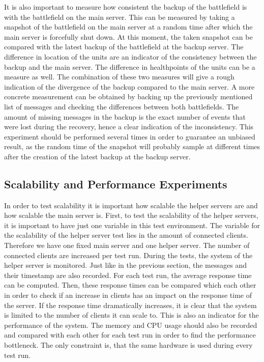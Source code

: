 It is also important to measure how consistent the backup of the battlefield is with the battlefield on the main server.
This can be measured by taking a snapshot of the battlefield on the main server at a random time after which the main server is forcefully shut down. 
At this moment, the taken snapshot can be compared with the latest backup of the battlefield at the backup server. 
The difference in location of the units are an indicator of the consistency between the backup and the main server. The difference in healthpoints of the units can be a measure as well. The combination of these two measures will give a rough indication of the divergence of the backup compared to the main server. 
A more concrete measurement can be obtained by backing up the previously mentioned list of messages and checking the differences between both battlefields. The amount of missing messages in the backup is the exact number of events that were lost during the recovery, hence a clear indication of the inconsistency. 
This experiment should be performed several times in order to guarantee an unbiased result, as the random time of the snapshot will probably sample at different times after the creation of the latest backup at the backup server. 

\subsection{Scalability and Performance Experiments}
In order to test scalability it is important how scalable the helper servers are and how scalable the main server is. 
First, to test the scalability of the helper servers, it is important to have just one variable in this test environment. 
The variable for the scalability of the helper server test lies in the amount of connected clients. 
Therefore we have one fixed main server and one helper server.
The number of connected clients are increased per test run. 
During the tests, the system of the helper server is monitored.
Just like in the previous section, the messages and their timestamp are also recorded.
For each test run, the average response time can be computed.
Then, these response times can be compared which each other in order to check if an increase in clients has an impact on the response time of the server.
If the response time dramatically increases, it is clear that the system is limited to the number of clients it can scale to. 
This is also an indicator for the performance of the system.
The memory and CPU usage should also be recorded  and compared with each other for each test run in order to find the performance bottleneck. 
The only constraint is, that the same hardware is used during every test run.

